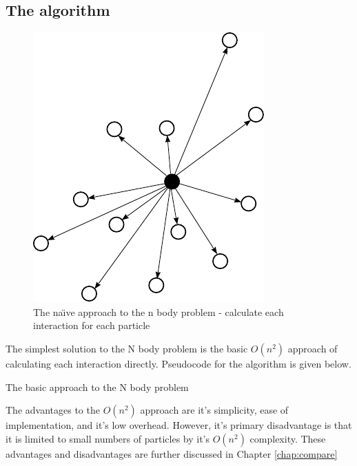 \documentclass[pdftex,twoside,a4paper]{report}
\newcommand{\bcen}{\begin{center}}
\newcommand{\ecen}{\end{center}}
\begin{document}
\subsection{The algorithm}
        
\begin{figure}[H]
\bcen \includegraphics{figures/nbodies.pdf} \ecen
\caption{The na\"{\i}ve approach to the n body problem - calculate each interaction for each particle}
\end{figure}

The simplest solution to the N body problem is the basic $O(n^2)$ approach of calculating each interaction directly. Pseudocode for the algorithm is given below.\\

\begin{algorithm}[H]
 \SetLine
 \caption{The basic approach to the N body problem}
\end{algorithm}

The advantages to the $O(n^2)$ approach are it's simplicity, ease of implementation, and it's low overhead. However, it's primary disadvantage is that it is limited to small numbers of particles by it's $O(n^2)$ complexity. These advantages and disadvantages are further discussed in Chapter \ref{chap:compare}
\end{document}
